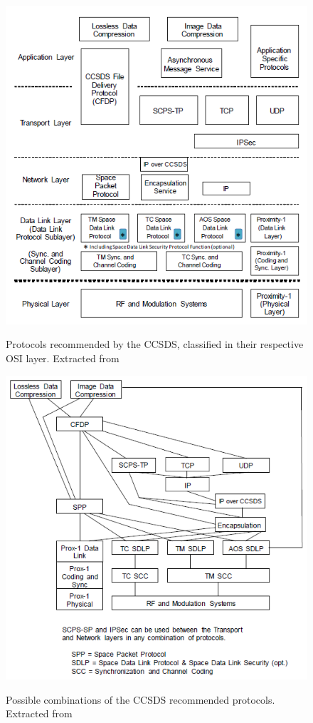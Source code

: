 \begin{figure}
\begin{center}
\includegraphics[scale=0.6]{SpaceSegment/Layer3/CCSDSprotocols.png}
\label{Protocols}
\caption{Protocols recommended by the CCSDS, classified in their respective OSI layer. Extracted from \cite{CCSDSOverview}}
\end{center}
\end{figure}
\begin{figure}
\begin{center}
\includegraphics[scale=0.6]{SpaceSegment/Layer3/CCSDScombinations.png}
\label{Comninations}
\caption{Possible combinations of the CCSDS recommended protocols. Extracted from \cite{CCSDSOverview}}
\end{center}
\end{figure}
